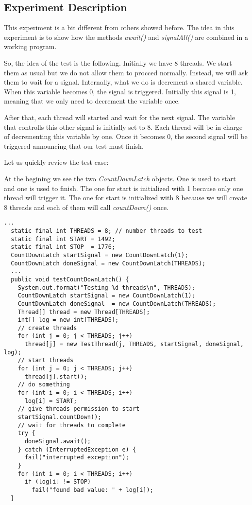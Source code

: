 \subsection{Experiment Description}
\par
This experiment is a bit different from others showed before. The idea in this
experiment is to show how the methods \textit{await()} and \textit{signalAll()}
are combined in a working program. 
\par
So, the idea of the test is the following. Initially we have 8 threads. We start
them as usual but we do not allow them to procced normally. Instead, we will ask
them to wait for a signal. Internally, what we do is decrement a shared
variable. When this variable becomes 0, the signal is triggered. Initially this
signal is 1, meaning that we only need to decrement the variable once.
\par
After that, each thread will started and wait for the next signal. The variable
that controlls this other signal is initially set to 8. Each thread will be in
charge of decrementing this variable by one. Once it becomes 0, the second
signal will be triggered announcing that our test must finish.
\par
Let us quickly review the test case:
\par
At the begining we see the two \textit{CountDownLatch} objects. One is used to
start and one is used to finish. The one for start is initialized with 1 because
only one thread will trigger it. The one for start is initialized with 8 because
we will create 8 threads and each of them will call \textit{countDown()} once.
\par
\hfill
\begin{lstlisting}[style=numbers]
  ...
  static final int THREADS = 8; // number threads to test
  static final int START = 1492;
  static final int STOP  = 1776;
  CountDownLatch startSignal = new CountDownLatch(1);
  CountDownLatch doneSignal = new CountDownLatch(THREADS);
  ...
  public void testCountDownLatch() {                                                                                
    System.out.format("Testing %d threads\n", THREADS);                                                             
    CountDownLatch startSignal = new CountDownLatch(1);
    CountDownLatch doneSignal  = new CountDownLatch(THREADS);
    Thread[] thread = new Thread[THREADS];
    int[] log = new int[THREADS];
    // create threads
    for (int j = 0; j < THREADS; j++)
      thread[j] = new TestThread(j, THREADS, startSignal, doneSignal, log);
    // start threads
    for (int j = 0; j < THREADS; j++)
      thread[j].start();
    // do something
    for (int i = 0; i < THREADS; i++)
      log[i] = START;
    // give threads permission to start
    startSignal.countDown();
    // wait for threads to complete
    try {
      doneSignal.await();
    } catch (InterruptedException e) {
      fail("interrupted exception");
    }
    for (int i = 0; i < THREADS; i++)
      if (log[i] != STOP)
        fail("found bad value: " + log[i]);
  }
\end{lstlisting}
